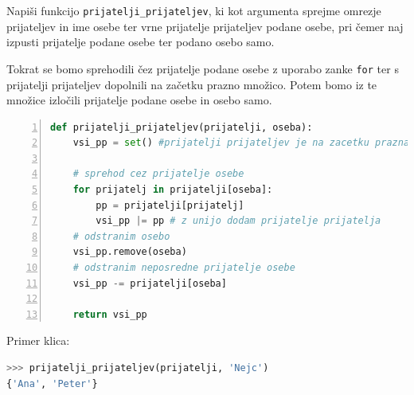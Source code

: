 \begin{zgled}
Napiši funkcijo \texttt{prijatelji\_prijateljev}, ki kot argumenta sprejme omrezje prijateljev in ime osebe ter vrne prijatelje prijateljev podane osebe, pri čemer naj izpusti prijatelje podane osebe ter podano osebo samo.
\end{zgled}
\begin{resitev}
Tokrat se bomo sprehodili čez prijatelje podane osebe z uporabo zanke \texttt{for} ter s prijatelji prijateljev dopolnili na začetku prazno množico. Potem bomo iz te množice izločili prijatelje podane osebe in osebo samo.
\begin{lstlisting}[language=Python,numbers=left]
def prijatelji_prijateljev(prijatelji, oseba):
    vsi_pp = set() #prijatelji prijateljev je na zacetku prazna
    
    # sprehod cez prijatelje osebe
    for prijatelj in prijatelji[oseba]:
        pp = prijatelji[prijatelj]
        vsi_pp |= pp # z unijo dodam prijatelje prijatelja
    # odstranim osebo
    vsi_pp.remove(oseba)
    # odstranim neposredne prijatelje osebe
    vsi_pp -= prijatelji[oseba]
    
    return vsi_pp

\end{lstlisting}
Primer klica:
\begin{lstlisting}[language=Python]
>>> prijatelji_prijateljev(prijatelji, 'Nejc')
{'Ana', 'Peter'}
\end{lstlisting}
\end{resitev}


